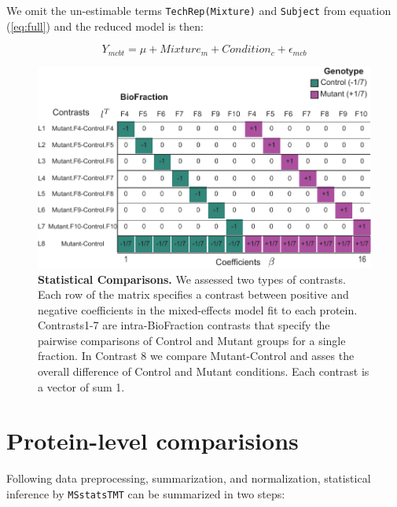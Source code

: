 \documentclass[12pt]{elife}\usepackage[]{graphicx}\usepackage[]{color}
\begin{document}
We omit the un-estimable terms \texttt{TechRep(Mixture)} and \texttt{Subject}
from equation (\ref{eq:full}) and the reduced model is then:

\begin{equation}
	\label{eq:fx0}
	Y_{mcbt} = \mu + Mixture_m + Condition_c + \epsilon_{mcb}
\end{equation}


\begin{figure}[ht!] %
  \begin{fullwidth}
  \begin{center}
	  \includegraphics[width=0.9\paperwidth,keepaspectratio]{contrasts}
	  \caption{\textbf{Statistical Comparisons.} We assessed two types of
	  contrasts. Each row of the matrix specifies a contrast between
	  positive and negative coefficients in the mixed-effects model fit to
	  each protein. Contrasts1-7 are intra-BioFraction contrasts that
	  specify the pairwise comparisons of Control and Mutant groups for a
	  single fraction. In Contrast 8 we compare Mutant-Control and asses
	  the overall difference of Control and Mutant conditions.  Each
	  contrast is a vector of sum 1.}
	  \label{fig:contrasts}
  \end{center}
  \end{fullwidth}
\end{figure}


\section{Protein-level comparisions}

Following data preprocessing, summarization, and normalization, statistical
inference by \texttt{MSstatsTMT} can be summarized in two steps:\\
\end{document}
